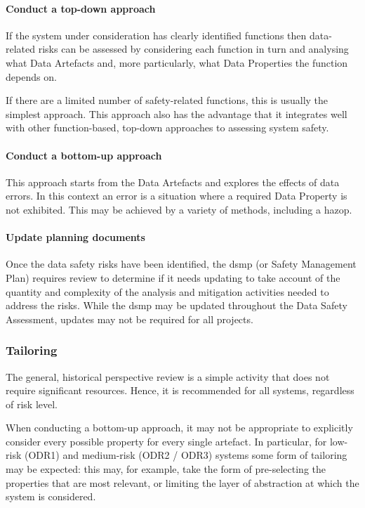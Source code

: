 \paragraph{Conduct a top-down approach}
If the system under consideration has clearly identified functions then data-related risks can be assessed by considering each function in turn and analysing what Data Artefacts and, more particularly, what Data Properties the function depends on.

If there are a limited number of safety-related functions, this is usually the simplest approach. This approach also has the advantage that it integrates well with other function-based, top-down approaches to assessing system safety. 

\paragraph{Conduct a bottom-up approach}
This approach starts from the Data Artefacts and explores the effects of data errors. In this context an error is a situation where a required Data Property is not exhibited. This may be achieved by a variety of methods, including a \gls{hazop}.

\paragraph{Update planning documents}
Once the data safety risks have been identified, the \gls{dsmp} (or Safety Management Plan)
requires review to determine if it needs
updating to take account of the quantity and complexity of the analysis and mitigation activities needed to address the risks. While the \gls{dsmp} may be updated throughout the Data Safety Assessment, updates may not be required for all projects.

\subsubsection{Tailoring}
The general, historical perspective review is a simple activity that does not require significant resources. Hence, it is recommended for all systems, regardless of risk level.

When conducting a bottom-up approach, it may not be appropriate to explicitly consider every possible property for every single artefact. In particular, for low-risk (ODR1) and medium-risk (ODR2 / ODR3) systems some form of tailoring may be expected: this may, for example, take the form of pre-selecting the properties that are most relevant, or limiting the layer of abstraction at which the system is considered.

